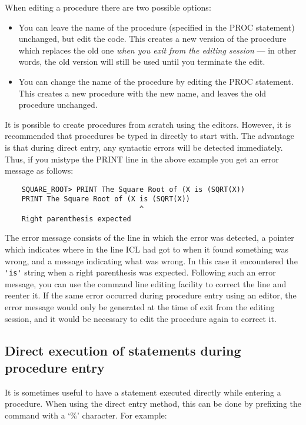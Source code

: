 When editing a procedure there are two possible options:
\begin{itemize}
\item You can leave the name of the procedure (specified in the PROC statement)
 unchanged, but edit the code.
 This creates a new version of the procedure which replaces the old one
 {\em when you exit from the editing session} --- in other words, the old
 version will still be used until you terminate the edit.
\item You can change the name of the procedure by editing the PROC statement.
 This creates a new procedure with the new name, and leaves the old procedure
 unchanged.
\end{itemize}
It is possible to create procedures from scratch using the editors.
However, it is recommended that procedures be typed in directly to start with.
The advantage is that during direct entry, any syntactic errors will be detected
immediately.
Thus, if you mistype the PRINT line in the above example you get an error
message as follows:

\begin{small}
\begin{verbatim}
    SQUARE_ROOT> PRINT The Square Root of (X is (SQRT(X))
    PRINT The Square Root of (X is (SQRT(X))
                                ^
    Right parenthesis expected
\end{verbatim}
\end{small}

The error message consists of the line in which the error was detected, a
pointer which indicates where in the line ICL had got to when it found something
was wrong, and a message indicating what was wrong.
In this case it encountered the \verb+'is'+ string when a right parenthesis was
expected.
Following such an error message, you can use the command line editing facility
to correct the line and reenter it.
If the same error occurred during procedure entry using an editor, the error
message would only be generated at the time of exit from the editing session,
and it would be necessary to edit the procedure again to correct it.

\subsection{Direct execution of statements during procedure entry}

It is sometimes useful to have a statement executed directly while entering
a procedure.
When using the direct entry method, this can be done by prefixing the command
with a `\%' character.
For example:

